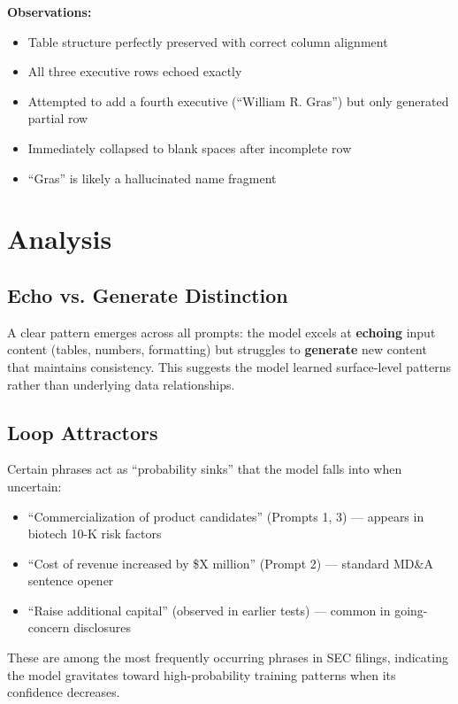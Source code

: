 \documentclass[12pt]{article}
\begin{document}
\textbf{Observations:}
\begin{itemize}
    \item Table structure perfectly preserved with correct column alignment
    \item All three executive rows echoed exactly
    \item Attempted to add a fourth executive (``William R. Gras'') but only generated partial row
    \item Immediately collapsed to blank spaces after incomplete row
    \item ``Gras'' is likely a hallucinated name fragment
\end{itemize}
\section{Analysis}

\subsection{Echo vs. Generate Distinction}

A clear pattern emerges across all prompts: the model excels at \textbf{echoing} input content (tables, numbers, formatting) but struggles to \textbf{generate} new content that maintains consistency. This suggests the model learned surface-level patterns rather than underlying data relationships.



\subsection{Loop Attractors}

Certain phrases act as ``probability sinks'' that the model falls into when uncertain:
\begin{itemize}
    \item ``Commercialization of product candidates'' (Prompts 1, 3) --- appears in biotech 10-K risk factors
    \item ``Cost of revenue increased by \$X million'' (Prompt 2) --- standard MD\&A sentence opener
    \item ``Raise additional capital'' (observed in earlier tests) --- common in going-concern disclosures
\end{itemize}

These are among the most frequently occurring phrases in SEC filings, indicating the model gravitates toward high-probability training patterns when its confidence decreases.
\end{document}
